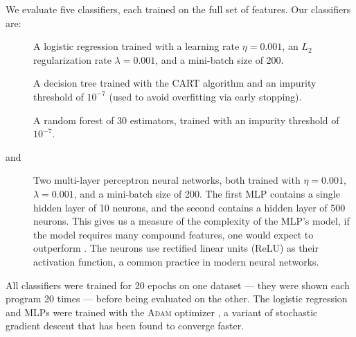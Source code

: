 We evaluate five classifiers, each trained on the full set of features.
%
%
Our classifiers are:
%
\begin{description}
\item[\linear] A logistic regression trained with a learning rate
  $\eta = 0.001$, an $L_2$ regularization rate $\lambda = 0.001$, and a
  mini-batch size of 200.
\item[\dectree] A decision tree trained with the CART algorithm
  \citep{Breiman1984-qy} and an impurity threshold of $10^{-7}$ (used to
  avoid overfitting via early stopping).
\item[\forest] A random forest \citep{Breiman2001-wo} of 30
  estimators, trained with an impurity threshold of $10^{-7}$.
\item[\hiddenT and \hiddenFH] Two multi-layer perceptron neural
  networks, both trained with $\eta = 0.001$, $\lambda = 0.001$, and a
  mini-batch size of 200.
  The first MLP contains a single hidden layer of 10 neurons, and the
  second contains a hidden layer of 500 neurons.
  This gives us a measure of the complexity of the MLP's model, \ie
  if the model requires many compound features, one would expect \hiddenFH
  to outperform \hiddenT.
  The neurons use rectified linear units (ReLU) as their activation
  function, a common practice in modern neural networks.
\end{description}
%
All classifiers were trained for 20 epochs on one dataset
--- \ie they were shown each program 20 times ---
before being evaluated on the other.
%
The logistic regression and MLPs were trained with the \textsc{Adam}
optimizer \citep{Kingma2014-ng}, a variant of stochastic gradient
descent that has been found to converge faster.



